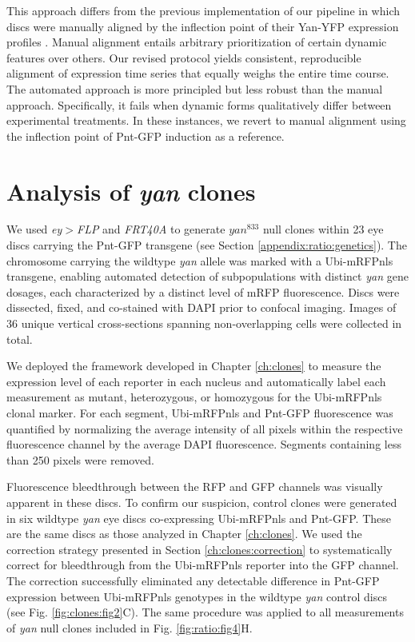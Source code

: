 This approach differs from the previous implementation of our pipeline in which discs were manually aligned by the inflection point of their Yan-YFP expression profiles \cite{Pelaez2015a}. Manual alignment entails arbitrary prioritization of certain dynamic features over others. Our revised protocol yields consistent, reproducible alignment of expression time series that equally weighs the entire time course. The automated approach is more principled but less robust than the manual approach. Specifically, it fails when dynamic forms qualitatively differ between experimental treatments. In these instances, we revert to manual alignment using the inflection point of Pnt-GFP induction as a reference.

\section{Analysis of \textit{yan} clones}
\label{appendix:ratio:clones}

We used \textit{ey$>$FLP} and \textit{FRT40A} to generate $yan^{833}$ null clones within 23 eye discs carrying the Pnt-GFP transgene (see Section \ref{appendix:ratio:genetics}). The chromosome carrying the wildtype \textit{yan} allele was marked with a Ubi-mRFPnls transgene, enabling automated detection of subpopulations with distinct \textit{yan} gene dosages, each characterized by a distinct level of mRFP fluorescence. Discs were dissected, fixed, and co-stained with DAPI prior to confocal imaging. Images of 36 unique vertical cross-sections spanning non-overlapping cells were collected in total. 

We deployed the framework developed in Chapter \ref{ch:clones} to measure the expression level of each reporter in each nucleus and automatically label each measurement as mutant, heterozygous, or homozygous for the Ubi-mRFPnls clonal marker. For each segment, Ubi-mRFPnls and Pnt-GFP fluorescence was quantified by normalizing the average intensity of all pixels within the respective fluorescence channel by the average DAPI fluorescence. Segments containing less than 250 pixels were removed. 

Fluorescence bleedthrough between the RFP and GFP channels was visually apparent in these discs. To confirm our suspicion, control clones were generated in six wildtype \textit{yan} eye discs co-expressing Ubi-mRFPnls and Pnt-GFP. These are the same discs as those analyzed in Chapter \ref{ch:clones}. We used the correction strategy presented in Section \ref{ch:clones:correction} to systematically correct for bleedthrough from the Ubi-mRFPnls reporter into the GFP channel. The correction successfully eliminated any detectable difference in Pnt-GFP expression between Ubi-mRFPnls genotypes in the wildtype \textit{yan} control discs (see Fig. \ref{fig:clones:fig2}C). The same procedure was applied to all measurements of \textit{yan} null clones included in Fig. \ref{fig:ratio:fig4}H.

